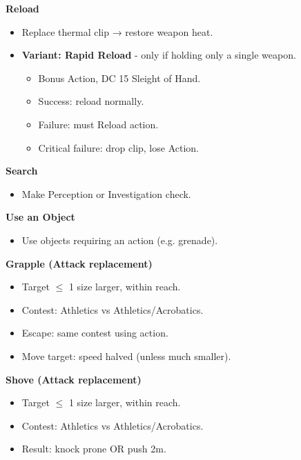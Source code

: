 \begin{scifitablebox}[screenbox,title=\textcolor{PanelGlow}{Combat Actions}]
\textbf{Reload}
\begin{itemize}
\item Replace thermal clip → restore weapon heat.
\item \textbf{Variant: Rapid Reload} - only if holding only a single weapon.
    \begin{itemize}
    \item Bonus Action, DC 15 Sleight of Hand.
    \item Success: reload normally.
    \item Failure: must Reload action.
    \item Critical failure: drop clip, lose Action.
    \end{itemize}
\end{itemize}

\textbf{Search}
\begin{itemize}
\item Make Perception or Investigation check.
\end{itemize}

\textbf{Use an Object}
\begin{itemize}
\item Use objects requiring an action (e.g. grenade).
\end{itemize}

\textbf{Grapple (Attack replacement)}
\begin{itemize}
\item Target $\leq$ 1 size larger, within reach.
\item Contest: Athletics vs Athletics/Acrobatics.
\item Escape: same contest using action.
\item Move target: speed halved (unless much smaller).
\end{itemize}

\textbf{Shove (Attack replacement)}
\begin{itemize}
\item Target $\leq$ 1 size larger, within reach.
\item Contest: Athletics vs Athletics/Acrobatics.
\item Result: knock prone OR push 2m.
\end{itemize}

\end{scifitablebox}

